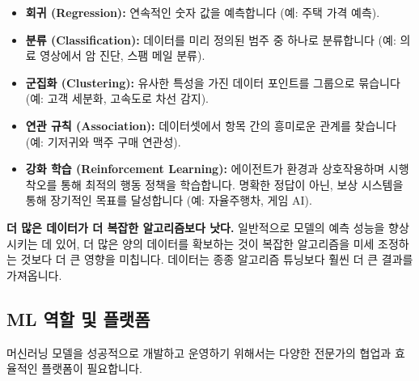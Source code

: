 \documentclass[11pt,a4paper]{article}
\begin{document}
\begin{tcolorbox}[summarybox={다양한 머신러닝 유형}]
\begin{itemize}
    \item \textbf{회귀 (Regression):} 연속적인 숫자 값을 예측합니다 (예: 주택 가격 예측).
    \item \textbf{분류 (Classification):} 데이터를 미리 정의된 범주 중 하나로 분류합니다 (예: 의료 영상에서 암 진단, 스팸 메일 분류).
    \item \textbf{군집화 (Clustering):} 유사한 특성을 가진 데이터 포인트를 그룹으로 묶습니다 (예: 고객 세분화, 고속도로 차선 감지).
    \item \textbf{연관 규칙 (Association):} 데이터셋에서 항목 간의 흥미로운 관계를 찾습니다 (예: 기저귀와 맥주 구매 연관성).
    \item \textbf{강화 학습 (Reinforcement Learning):} 에이전트가 환경과 상호작용하며 시행착오를 통해 최적의 행동 정책을 학습합니다. 명확한 정답이 아닌, 보상 시스템을 통해 장기적인 목표를 달성합니다 (예: 자율주행차, 게임 AI).
\end{itemize}
\end{tcolorbox}

\begin{tcolorbox}[warningbox={데이터의 중요성}]
\textbf{더 많은 데이터가 더 복잡한 알고리즘보다 낫다.}
일반적으로 모델의 예측 성능을 향상시키는 데 있어, 더 많은 양의 데이터를 확보하는 것이 복잡한 알고리즘을 미세 조정하는 것보다 더 큰 영향을 미칩니다. 데이터는 종종 알고리즘 튜닝보다 훨씬 더 큰 결과를 가져옵니다.
\end{tcolorbox}

\subsection*{ML 역할 및 플랫폼}
머신러닝 모델을 성공적으로 개발하고 운영하기 위해서는 다양한 전문가의 협업과 효율적인 플랫폼이 필요합니다.
\end{document}
